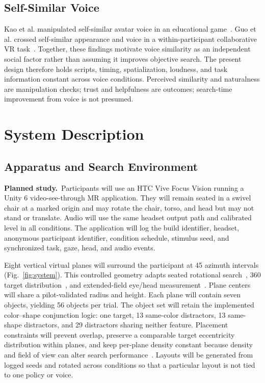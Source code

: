 \documentclass[10pt,journal,compsoc]{IEEEtran}
\newcommand{\planned}{\textbf{Planned study.}\ }
\begin{document}
\subsection{Self-Similar Voice}
Kao et al. manipulated self-similar avatar voice in an educational game~\cite{kao2021selfsimilar}. Guo et al. crossed self-similar appearance and voice in a within-participant collaborative VR task~\cite{guo2024doppelganger}. Together, these findings motivate voice similarity as an independent social factor rather than assuming it improves objective search. The present design therefore holds scripts, timing, spatialization, loudness, and task information constant across voice conditions. Perceived similarity and naturalness are manipulation checks; trust and helpfulness are outcomes; search-time improvement from voice is not presumed.

\section{System Description}
\subsection{Apparatus and Search Environment}
\planned Participants will use an HTC Vive Focus Vision running a Unity 6 video-see-through MR application. They will remain seated in a swivel chair at a marked origin and may rotate the chair, torso, and head but may not stand or translate. Audio will use the same headset output path and calibrated level in all conditions. The application will log the build identifier, headset, anonymous participant identifier, condition schedule, stimulus seed, and synchronized task, gaze, head, and audio events.

Eight vertical virtual planes will surround the participant at 45\textdegree{} azimuth intervals (Fig.~\ref{fig:system}). This controlled geometry adapts seated rotational search~\cite{warden2022visual}, 360\textdegree{} target distribution~\cite{kelley2025cueing}, and extended-field eye/head measurement~\cite{stein2024eyehead}. Plane centers will share a pilot-validated radius and height. Each plane will contain seven objects, yielding 56 objects per trial. The object set will retain the implemented color--shape conjunction logic: one target, 13 same-color distractors, 13 same-shape distractors, and 29 distractors sharing neither feature. Placement constraints will prevent overlap, preserve a comparable target eccentricity distribution within planes, and keep per-plane density constant because density and field of view can alter search performance~\cite{trepkowski2019fov}. Layouts will be generated from logged seeds and rotated across conditions so that a particular layout is not tied to one policy or voice.
\end{document}
